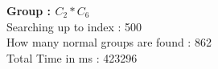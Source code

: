 \textbf{Group : $C_2*C_6$}\\
Searching up to index : 500\\
How many normal groups are found : 862\\
Total Time in ms : 423296\\
